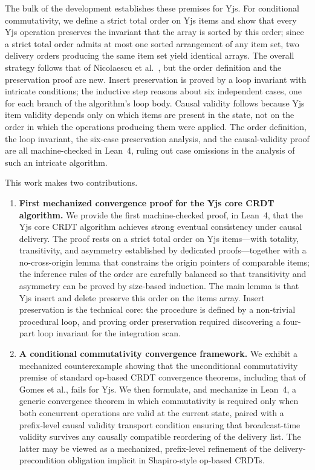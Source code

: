 \documentclass[sigplan,screen]{acmart}
\begin{document}
The bulk of the development establishes these premises for Yjs.  For
conditional commutativity, we define a strict total order on Yjs items
and show that every Yjs operation preserves the invariant that the
array is sorted by this order; since a strict total order admits at
most one sorted arrangement of any item set, two delivery orders
producing the same item set yield identical arrays.  The overall
strategy follows that of Nicolaescu et al.~\cite{Nicolaescu2016}, but
the order definition and the preservation proof are new.  Insert
preservation is proved by a loop invariant with intricate conditions;
the inductive step reasons about six independent cases, one for each
branch of the algorithm's loop body.  Causal validity follows because Yjs item validity depends only
on which items are present in the state, not on the order in which
the operations producing them were applied.  The order definition,
the loop invariant, the six-case preservation analysis, and the
causal-validity proof are all machine-checked in Lean~4, ruling out
case omissions in the analysis of such an intricate algorithm.

This work makes two contributions.
\begin{enumerate}
\item \textbf{First mechanized convergence proof for the Yjs core CRDT
  algorithm.}
  We provide the first machine-checked proof, in Lean~4, that the Yjs
  core CRDT algorithm achieves strong eventual consistency under causal
  delivery.  The proof rests on a strict total order on Yjs
  items---with totality, transitivity, and asymmetry established by
  dedicated proofs---together with a no-cross-origin lemma that
  constrains the origin pointers of comparable items; the inference
  rules of the order are carefully balanced so that transitivity and
  asymmetry can be proved by size-based induction.  The main lemma is
  that Yjs insert and delete preserve this order on the items array.
  Insert preservation is the technical core: the procedure is defined
  by a non-trivial procedural loop, and proving order preservation
  required discovering a four-part loop invariant for the integration
  scan.
\item \textbf{A conditional commutativity convergence framework.}
  We exhibit a mechanized counterexample showing that the unconditional
  commutativity premise of standard op-based CRDT convergence theorems,
  including that of Gomes et al., fails for Yjs.  We then formulate,
  and mechanize in Lean~4, a generic convergence theorem in which
  commutativity is required only when both concurrent operations are
  valid at the current state, paired with a prefix-level causal
  validity transport condition ensuring that broadcast-time validity
  survives any causally compatible reordering of the delivery list.
  The latter may be viewed as a mechanized, prefix-level refinement of
  the delivery-precondition obligation implicit in Shapiro-style
  op-based CRDTs.
\end{enumerate}
\end{document}
